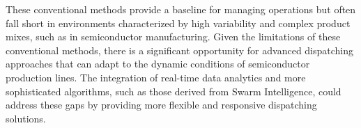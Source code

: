 These conventional methods provide a baseline for managing operations but often fall short in environments characterized by high variability and complex product mixes, such as in semiconductor manufacturing. %
Given the limitations of these conventional methods, there is a significant opportunity for advanced dispatching approaches that can adapt to the dynamic conditions of semiconductor production lines. The integration of real-time data analytics and more sophisticated algorithms, such as those derived from Swarm Intelligence, could address these gaps by providing more flexible and responsive dispatching solutions.

























